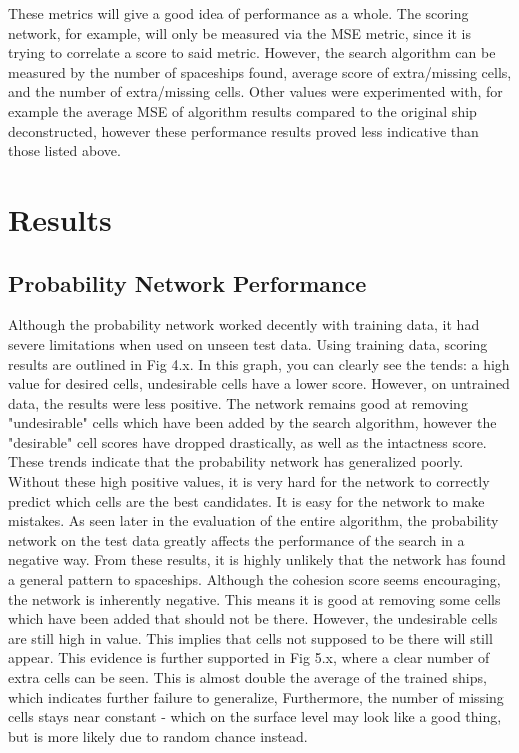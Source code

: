 \documentclass{l4proj}
\begin{document}
These metrics will give a good idea of performance as a whole. The scoring network, for example, will only be measured via the MSE metric, since it is trying to correlate a score to said metric. However, the search algorithm can be measured by the number of spaceships found, average score of extra/missing cells, and the number of extra/missing cells. Other values were experimented with, for example the average MSE of algorithm results compared to the original ship deconstructed, however these performance results proved less indicative than those listed above.

\section{Results}

\subsection{Probability Network Performance}

Although the probability network worked decently with training data, it had severe limitations when used on unseen test data. Using training data, scoring results are outlined in Fig 4.x. In this graph, you can clearly see the tends: a high value for desired cells, undesirable cells have a lower score. However, on untrained data, the results were less positive. The network remains good at removing "undesirable" cells which have been added by the search algorithm, however the "desirable" cell scores have dropped drastically, as well as the intactness score. These trends indicate that the probability network has generalized poorly. Without these high positive values, it is very hard for the network to correctly predict which cells are the best candidates. It is easy for the network to make mistakes. As seen later in the evaluation of the entire algorithm, the probability network on the test data greatly affects the performance of the search in a negative way. From these results, it is highly unlikely that the network has found a general pattern to spaceships. Although the cohesion score seems encouraging, the network is inherently negative. This means it is good at removing some cells which have been added that should not be there. However, the undesirable cells are still high in value. This implies that cells not supposed to be there will still appear. This evidence is further supported in Fig 5.x, where a clear number of extra cells can be seen. This is almost double the average of the trained ships, which indicates further failure to generalize, Furthermore, the number of missing cells stays near constant - which on the surface level may look like a good thing, but is more likely due to random chance instead. 
\end{document}
